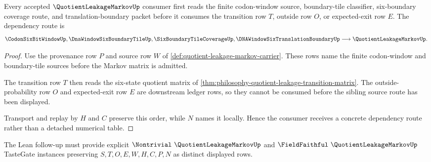 \begin{theorem}
\label{thm:quotient-leakage-markov-sibling-dependency-route}
Every accepted $\QuotientLeakageMarkovUp$ consumer first reads the finite codon-window source, boundary-tile classifier, six-boundary coverage route, and translation-boundary packet before it consumes the transition row $T$, outside row $O$, or expected-exit row $E$. The dependency route is
$$
\CodonSixBitWindowUp,\DnaWindowSixBoundaryTileUp,\SixBoundaryTileCoverageUp,\DNAWindowSixTranslationBoundaryUp
\longrightarrow
\QuotientLeakageMarkovUp .
$$
\end{theorem}
\begin{proof}
Use the provenance row $P$ and source row $W$ of \autoref{def:quotient-leakage-markov-carrier}. These rows name the finite codon-window and boundary-tile sources before the Markov matrix is admitted.

The transition row $T$ then reads the six-state quotient matrix of \autoref{thm:philosophy-quotient-leakage-transition-matrix}. The outside-probability row $O$ and expected-exit row $E$ are downstream ledger rows, so they cannot be consumed before the sibling source route has been displayed.

Transport and replay by $H$ and $C$ preserve this order, while $N$ names it locally. Hence the consumer receives a concrete dependency route rather than a detached numerical table.
\end{proof}



The Lean follow-up must provide explicit $\Nontrivial\ \QuotientLeakageMarkovUp$ and $\FieldFaithful\ \QuotientLeakageMarkovUp$ TasteGate instances preserving $S,T,O,E,W,H,C,P,N$ as distinct displayed rows.


